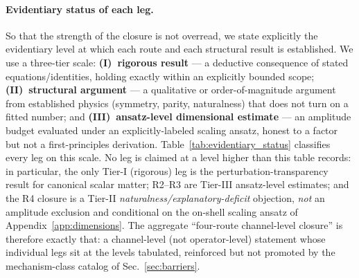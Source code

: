 \documentclass[aps,prd,twocolumn,superscriptaddress,showpacs,preprintnumbers,nofootinbib,longbibliography,floatfix]{revtex4-2}
\begin{document}
\paragraph{Evidentiary status of each leg.} So that the strength of
the closure is not overread, we state explicitly the evidentiary level
at which each route and each structural result is established. We use a
three-tier scale: \textbf{(I)~rigorous result} --- a deductive
consequence of stated equations/identities, holding exactly within an
explicitly bounded scope; \textbf{(II)~structural argument} --- a
qualitative or order-of-magnitude argument from established physics
(symmetry, parity, naturalness) that does not turn on a fitted number;
and \textbf{(III)~ansatz-level dimensional estimate} --- an
amplitude budget evaluated under an explicitly-labeled scaling ansatz,
honest to a factor but not a first-principles derivation.
Table~\ref{tab:evidentiary_status} classifies every leg on this scale.
No leg is claimed at a level higher than this table records: in
particular, the only Tier-I (rigorous) leg is the
perturbation-transparency result for canonical scalar matter; R2--R3 are
Tier-III ansatz-level estimates; and the R4 closure is a Tier-II
\emph{naturalness/explanatory-deficit} objection, \emph{not} an amplitude
exclusion and conditional on the on-shell scaling ansatz of
Appendix~\ref{app:dimensions}. The aggregate ``four-route channel-level
closure'' is therefore exactly that: a channel-level (not operator-level)
statement whose individual legs sit at the levels tabulated, reinforced
but not promoted by the mechanism-class catalog of
Sec.~\ref{sec:barriers}.
\end{document}

